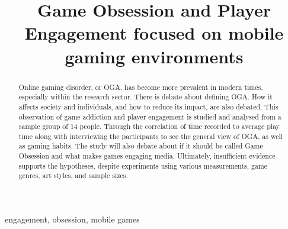 \documentclass[conference]{IEEEtran}
\begin{document}


\lstset{style=style}

\title{Game Obsession and Player Engagement focused on mobile gaming environments \\
}

\author{
}

\maketitle



\begin{abstract}
Online gaming disorder, or OGA, has become more prevalent in modern times, especially within the research sector. There is debate about defining OGA.  How it affects society and individuals, and how to reduce its impact, are also debated. This observation of game addiction and player engagement is studied and analysed from a sample group of 14 people. Through the correlation of time recorded to average play time along with interviewing the participants to see the general view of OGA, as well as gaming habits. The study will also debate about if it should be called Game Obsession and what makes games engaging media. Ultimately, insufficient evidence supports the hypotheses, despite experiments using various measurements, game genres, art styles, and sample sizes.
\end{abstract}
\begin{IEEEkeywords}
engagement, obsession, mobile games
\end{IEEEkeywords}
\end{document}
